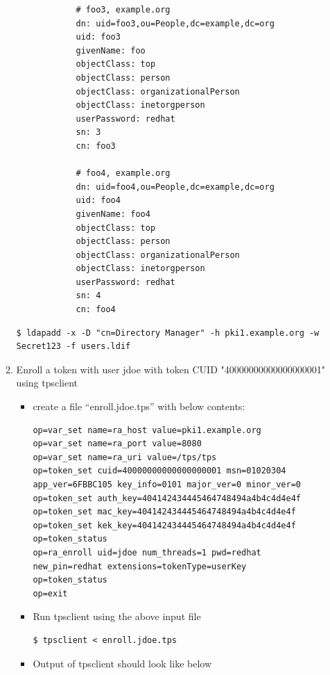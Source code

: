 \documentclass[a4paper]{article}
\begin{document}
\begin{enumerate}[label*=\arabic*.]
\begin{enumerate}[label*=\arabic*.]
\begin{lstlisting}
            # foo3, example.org
            dn: uid=foo3,ou=People,dc=example,dc=org
            uid: foo3
            givenName: foo
            objectClass: top
            objectClass: person
            objectClass: organizationalPerson
            objectClass: inetorgperson
            userPassword: redhat
            sn: 3
            cn: foo3

            # foo4, example.org
            dn: uid=foo4,ou=People,dc=example,dc=org
            uid: foo4
            givenName: foo4
            objectClass: top
            objectClass: person
            objectClass: organizationalPerson
            objectClass: inetorgperson
            userPassword: redhat
            sn: 4
            cn: foo4
            \end{lstlisting}
            \begin{lstlisting}[style=bashInputStyle]
$ ldapadd -x -D "cn=Directory Manager" -h pki1.example.org -w Secret123 -f users.ldif
            \end{lstlisting}
        \item \label{token_ex2} Enroll a token with user jdoe with token CUID "40000000000000000001" using tpsclient
                \begin{itemize}
                    \item create a file ``enroll.jdoe.tps'' with below contents:
                        \begin{lstlisting}[style=configFile]
op=var_set name=ra_host value=pki1.example.org
op=var_set name=ra_port value=8080
op=var_set name=ra_uri value=/tps/tps
op=token_set cuid=40000000000000000001 msn=01020304 app_ver=6FBBC105 key_info=0101 major_ver=0 minor_ver=0
op=token_set auth_key=404142434445464748494a4b4c4d4e4f
op=token_set mac_key=404142434445464748494a4b4c4d4e4f
op=token_set kek_key=404142434445464748494a4b4c4d4e4f
op=token_status
op=ra_enroll uid=jdoe num_threads=1 pwd=redhat new_pin=redhat extensions=tokenType=userKey
op=token_status
op=exit
                        \end{lstlisting}
                    \item \label{token_ex3} Run tpsclient using the above input file 
                        \begin{lstlisting}[style=bashInputStyle]
$ tpsclient < enroll.jdoe.tps               
                        \end{lstlisting}
                    \item \label{token_ex4} Output of tpsclient should look like below

\end{itemize}
\end{enumerate}
\end{enumerate}
\end{document}
